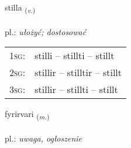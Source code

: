 \documentclass[frontgrid, backgrid]{flacards}\usepackage[]{graphicx}\usepackage[]{xcolor}
\begin{document}
\renewcommand{\flhead}{\vskip5pt \fboxsep=0pt {\small\bfseries\footnotesize Sagnorð | Verb}}
\renewcommand{\fcfoot}{\vskip5pt \fboxsep=0pt \hspace{2pt}{\small\bfseries\footnotesize 2K}}

\renewcommand{\blhead}{\vskip5pt {\small\bfseries\footnotesize Sagnorð | Verb }}
\renewcommand{\bcfoot}{\vskip5pt \hspace{2pt}{\small\bfseries\footnotesize 2K}}


{stilla \small{\textsubscript{(\textit{v.})}} \\[1ex] %
\textphonetic{[stɪtla]} \\
pl.: \emph{ułożyć; dostosować} \\  [2ex]
\renewcommand*{\arraystretch}{0.8}
\begin{tabular}{p{1cm}l}
\textsc{1sg}: & stilli -- stillti -- stillt \\ 
\textsc{2sg}: & stillir -- stilltir -- stillt \\ 
\textsc{3sg}: & stillir -- stillti -- stillt \\ 
\end{tabular}
}

\renewcommand{\flhead}{\vskip5pt \fboxsep=0pt {\small\bfseries\footnotesize Nafnorð | Noun}}
\renewcommand{\fcfoot}{\vskip5pt \fboxsep=0pt \hspace{2pt}{\small\bfseries\footnotesize 2K}}

\renewcommand{\blhead}{\vskip5pt {\small\bfseries\footnotesize Nafnorð | Noun }}
\renewcommand{\bcfoot}{\vskip5pt \hspace{2pt}{\small\bfseries\footnotesize 2K}}


{fyrirvari \small{\textsubscript{(\textit{m.})}} \\[1ex] %
\textphonetic{[fɪːrɪrvarɪ]} \\
pl.: \emph{uwaga, ogłoszenie} \\  [2ex]
\renewcommand*{\arraystretch}{0.8}
}
\end{document}
